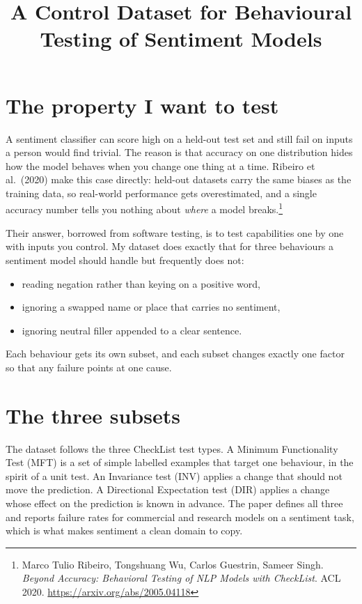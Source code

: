 \documentclass[11pt]{article}
\title{A Control Dataset for Behavioural Testing of Sentiment Models}
\begin{document}
\maketitle

\section{The property I want to test}

A sentiment classifier can score high on a held-out test set and still fail
on inputs a person would find trivial. The reason is that accuracy on one
distribution hides how the model behaves when you change one thing at a time.
Ribeiro et al.\ (2020) make this case directly: held-out datasets carry the
same biases as the training data, so real-world performance gets
overestimated, and a single accuracy number tells you nothing about
\emph{where} a model breaks.\footnote{Marco Tulio Ribeiro, Tongshuang Wu,
Carlos Guestrin, Sameer Singh. \emph{Beyond Accuracy: Behavioral Testing of
NLP Models with CheckList}. ACL 2020.
\url{https://arxiv.org/abs/2005.04118}}

Their answer, borrowed from software testing, is to test capabilities one by
one with inputs you control. My dataset does exactly that for three
behaviours a sentiment model should handle but frequently does not:

\begin{itemize}[noitemsep]
  \item reading negation rather than keying on a positive word,
  \item ignoring a swapped name or place that carries no sentiment,
  \item ignoring neutral filler appended to a clear sentence.
\end{itemize}

Each behaviour gets its own subset, and each subset changes exactly one
factor so that any failure points at one cause.

\section{The three subsets}

The dataset follows the three CheckList test types. A Minimum Functionality
Test (MFT) is a set of simple labelled examples that target one behaviour, in
the spirit of a unit test. An Invariance test (INV) applies a change that
should not move the prediction. A Directional Expectation test (DIR) applies
a change whose effect on the prediction is known in advance. The paper
defines all three and reports failure rates for commercial and research
models on a sentiment task, which is what makes sentiment a clean domain to
copy.
\end{document}
